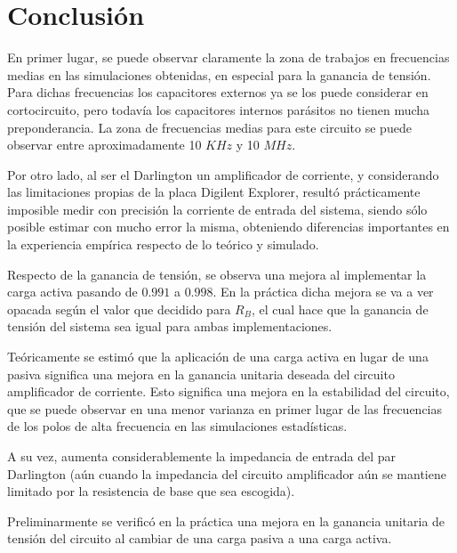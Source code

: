 \chapter{Conclusión}
En primer lugar, se puede observar claramente la zona de trabajos en frecuencias medias en las simulaciones obtenidas, en especial para la 
ganancia de tensión. Para dichas frecuencias los capacitores externos ya se los puede considerar en cortocircuito, pero todavía los capacitores 
internos parásitos no tienen mucha preponderancia. La zona de frecuencias medias para este circuito se puede observar entre aproximadamente 
10 $KHz$ y 10 $MHz$. \par 

Por otro lado, al ser el Darlington un amplificador de corriente, y considerando las limitaciones propias de la placa Digilent Explorer,
 resultó prácticamente imposible medir con precisión la corriente de entrada del  sistema, siendo sólo posible estimar con mucho error la misma,
  obteniendo diferencias importantes en la experiencia empírica respecto de
 lo teórico y simulado. \par 

 Respecto de la ganancia de tensión, se observa una mejora al implementar la carga activa pasando de $0.991$ a $0.998$. En la práctica dicha mejora se 
 va a ver opacada según el valor que decidido para $R_B$, el cual hace que la ganancia de tensión del sistema sea igual para ambas implementaciones.


Teóricamente se estimó que la aplicación de una carga activa en lugar de una pasiva significa una mejora en la ganancia unitaria 
deseada del circuito amplificador de corriente. Esto significa una mejora en la estabilidad del circuito, que se puede observar en una menor varianza en primer lugar de las frecuencias de los polos de alta frecuencia en las simulaciones estadísticas.

A su vez, aumenta considerablemente la impedancia de entrada del par Darlington (aún cuando la impedancia del circuito amplificador aún se mantiene limitado por la resistencia de base que sea escogida).

Preliminarmente se verificó en la práctica una mejora en la ganancia unitaria de tensión del circuito al cambiar de una carga pasiva a una carga activa.
